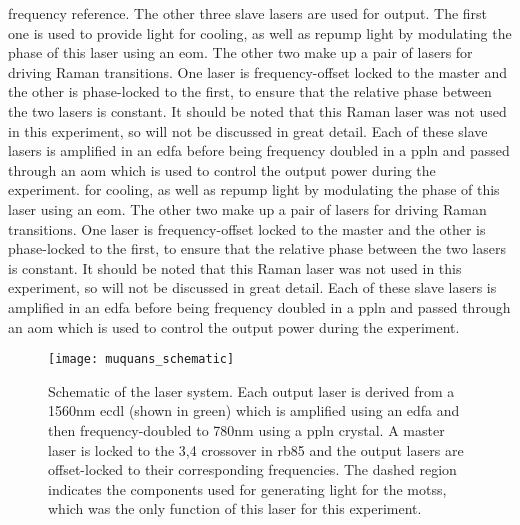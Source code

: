frequency reference. The other three slave lasers are used for output. The first one is used to provide light for cooling, as well as repump light by modulating the phase of this laser using an \ac{eom}. The other two make up a pair of lasers for driving Raman transitions. One laser is frequency-offset locked to the master and the other is phase-locked to the first, to ensure that the relative phase between the two lasers is constant. It should be noted that this Raman laser was not used in this experiment, so will not be discussed in great detail. Each of these slave lasers is amplified in an \ac{edfa} before being frequency doubled in a \ac{ppln} and passed through an \ac{aom} which is used to control the output power during the experiment.  for cooling, as well as repump light by modulating the phase of this laser using an \ac{eom}. The other two make up a pair of lasers for driving Raman transitions. One laser is frequency-offset locked to the master and the other is phase-locked to the first, to ensure that the relative phase between the two lasers is constant. It should be noted that this Raman laser was not used in this experiment, so will not be discussed in great detail. Each of these slave lasers is amplified in an \ac{edfa} before being frequency doubled in a \ac{ppln} and passed through an \ac{aom} which is used to control the output power during the experiment. 
\begin{figure}[!htbp]
    \texttt{[image: muquans\_schematic]}
    \caption[\Muquans Laser System Diagram]{Schematic of the \Muquans laser system. Each output laser is derived from a 1560nm \acs{ecdl} (shown in green) which is amplified using an \acs{edfa} and then frequency-doubled to 780nm using a \acs{ppln} crystal. A master laser is locked to the 3,4 crossover in \ac{rb85} and the output lasers are offset-locked to their corresponding frequencies. The dashed region indicates the components used for generating light for the \acp{mots}, which was the only function of this laser for this experiment.}\label{fig:muquans_schematic}
\end{figure}
